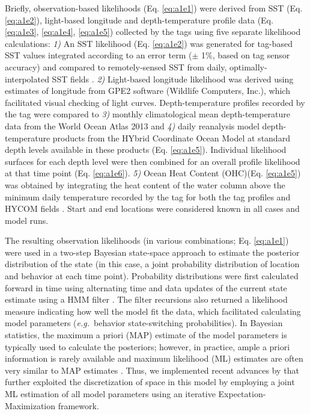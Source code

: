 Briefly, observation-based likelihoods (Eq. \ref{eq:a1e1}) were derived from \is SST (Eq. \ref{eq:a1e2}), light-based longitude and depth-temperature profile
data (Eq. \ref{eq:a1e3}, \ref{eq:a1e4}, \ref{eq:a1e5}) collected by the tags using five separate
likelihood calculations: \emph{1)} An SST likelihood (Eq. \ref{eq:a1e2}) was
generated for tag-based SST values integrated according to an error term
($\pm$ 1\%, based on tag sensor accuracy) and compared to
remotely-sensed SST from daily, optimally-interpolated SST fields
\citep[OI-SST, 0.25$^{\circ}$ resolution;][]{Banzon2016}. \emph{2)} Light-based
longitude likelihood was derived using estimates of longitude from GPE2
software (Wildlife Computers, Inc.), which facilitated visual checking
of light curves. Depth-temperature profiles recorded by the tag were
compared to \emph{3)} monthly climatological mean depth-temperature data
from the World Ocean Atlas 2013 \citep[WOA, 0.25$^{\circ}$
resolution;][]{Locarnini2013} and \emph{4)} daily reanalysis model
depth-temperature products from the HYbrid Coordinate Ocean Model
\citep[HYCOM, 0.08$^{\circ}$ resolution;][]{Chassignet2007} at standard depth
levels available in these products (Eq. \ref{eq:a1e5}). Individual likelihood
surfaces for each depth level were then combined for an overall profile
likelihood at that time point (Eq. \ref{eq:a1e6}). \emph{5)} Ocean Heat Content
(OHC)(Eq. \ref{eq:a1e5}) was obtained by integrating the heat content of the water
column above the minimum daily temperature recorded by the tag for both
the tag profiles and HYCOM fields \citep[Eq. \ref{eq:a1e4};][]{Luo2015}. Start and
end locations were considered known in all cases and model runs.

The resulting observation likelihoods (in various combinations; Eq. \ref{eq:a1e1})
were used in a two-step Bayesian state-space approach to estimate the
posterior distribution of the state (in this case, a joint probability
distribution of location and behavior at each time point). Probability
distributions were first calculated forward in time using alternating
time and data updates of the current state estimate using a HMM filter
\citep[for a detailed methodology of the HMM filter see Appendix 2
in][]{Pedersen2011}. The filter recursions also returned a likelihood
measure indicating how well the model fit the data, which facilitated
calculating model parameters (\emph{e.g.}~behavior state-switching
probabilities). In Bayesian statistics, the maximum a priori (MAP)
estimate of the model parameters is typically used to calculate the
posteriors; however, in practice, ample a priori information is rarely
available and maximum likelihood (ML) estimates are often very similar
to MAP estimates \citep{Jonsen2005}. Thus, we implemented recent
advances by \citet{Woillez2016} that further exploited the
discretization of space in this model by employing a joint ML estimation
of all model parameters using an iterative Expectation-Maximization
framework.

